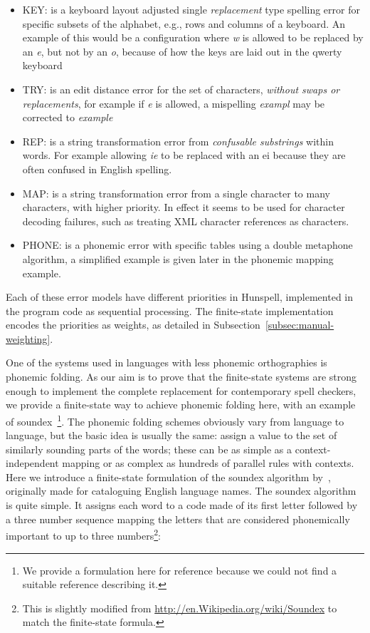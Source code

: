\documentclass[a4paper,12pt]{article}
\begin{document}
\begin{itemize}
    \item KEY: is a keyboard layout adjusted single \emph{replacement} type
        spelling error for specific subsets of the alphabet, e.g., rows and
        columns of a keyboard. An example of this would be a configuration
        where \emph{w} is allowed to be replaced by an \emph{e}, but not
        by an \emph{o}, because of how the keys are laid out in the qwerty
        keyboard
    \item TRY: is an edit distance error for the set of characters,
        \emph{without swaps or replacements}, for example if \emph{e} is
        allowed, a mispelling \emph{exampl} may be corrected to \emph{example}
    \item REP: is a string transformation error from \emph{confusable
        substrings} within words. For example allowing \emph{ie} to be replaced
        with an {ei} because they are often confused in English spelling.
    \item MAP: is a string transformation error from a single character to
        many characters, with higher priority. In effect it seems to be
        used for character decoding failures, such as treating XML character
        references as characters.
    \item PHONE: is a phonemic error with specific tables using a double
        metaphone algorithm, a simplified example is given later in the
        phonemic mapping example.
\end{itemize}

Each of these error models have different priorities in Hunspell, implemented
in the program code as sequential processing. The finite-state implementation
encodes the priorities as weights, as detailed in
Subsection~\ref{subsec:manual-weighting}.

One of the systems used in languages with less phonemic
orthographies is phonemic folding. As our aim is to prove that the
finite-state systems are strong enough to implement the complete
replacement for contemporary spell checkers, we provide a finite-state way
to achieve phonemic folding here, with an example of soundex~\footnote{We
provide a formulation here for reference because we could not find a suitable
reference describing it.}. The phonemic folding
schemes obviously vary from language to language, but the basic idea is
usually the same: assign a value to the set of similarly sounding parts of
the words; these can be as simple as a context-independent mapping or as
complex as hundreds of parallel rules with contexts. Here we introduce a
finite-state formulation of the soundex algorithm by~\cite{russell1918soundex},
originally made for cataloguing English language names. The soundex algorithm
is quite simple. It assigns each word to a code made of its first letter
followed by a three number sequence mapping the letters that are considered
phonemically important to up to three numbers\footnote{This is slightly
modified from \url{http://en.Wikipedia.org/wiki/Soundex} to match the
finite-state formula.}:
\end{document}
